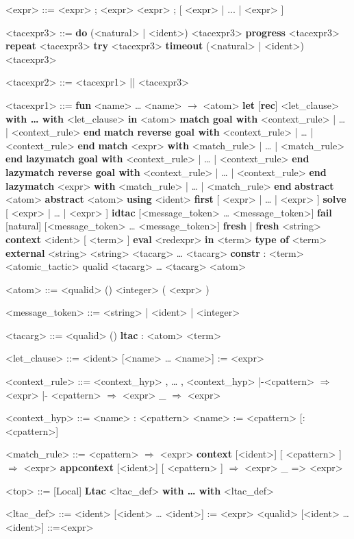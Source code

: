 \documentclass[a4paper, 10pt]{article}
\begin{document}
\begin{grammar}

<expr> ::= <expr> ; <expr>
\alt <expr> ; [ <expr> | ... | <expr> ]

<tacexpr3> ::= \textbf{do} (<natural> | <ident>) <tacexpr3>
 	\alt \textbf{progress} <tacexpr3>
 	\alt \textbf{repeat} <tacexpr3>
 	\alt \textbf{try} <tacexpr3>
 	\alt \textbf{timeout} (<natural> | <ident>) <tacexpr3>
 	\alt <tacexpr2>



<tacexpr2> ::= <tacexpr1> || <tacexpr3>
 	 \alt <tacexpr1>

<tacexpr1> ::= 	\textbf{fun} <name>  …  <name> $\rightarrow$ <atom>
 	\alt \textbf{let} [\textbf{rec}] <let\_clause> \textbf{with … with} <let\_clause> \textbf{in} <atom>
 	\alt \textbf{match goal with} <context\_rule> | … | <context\_rule> \textbf{end}
 	\alt \textbf{match reverse goal with} <context\_rule> | … | <context\_rule> \textbf{end}
 	\alt \textbf{match} <expr> \textbf{with} <match\_rule> | … | <match\_rule> \textbf{end}
 	\alt \textbf{lazymatch goal with} <context\_rule> | … | <context\_rule> \textbf{end}
 	\alt \textbf{lazymatch reverse goal with} <context\_rule> | … | <context\_rule> \textbf{end}
 	\alt \textbf{lazymatch} <expr> \textbf{with} <match\_rule> | … | <match\_rule> \textbf{end}
 	\alt \textbf{abstract} <atom>
 	\alt \textbf{abstract} <atom> \textbf{using} <ident>
 	\alt \textbf{first} [ <expr> | … | <expr> ]
 	\alt \textbf{solve} [ <expr> | … | <expr> ]
 	\alt \textbf{idtac} [<message\_token>  …  <message\_token>]
 	\alt \textbf{fail} [natural] [<message\_token>  …  <message\_token>]
 	\alt \textbf{fresh}  |  \textbf{fresh} <string>
 	\alt \textbf{context} <ident> [ <term> ]
 	\alt \textbf{eval} <redexpr> \textbf{in} <term>
 	\alt \textbf{type of} <term>
 	\alt \textbf{external} <string> <string> <tacarg>  …  <tacarg>
 	\alt \textbf{constr} : <term>
 	\alt <atomic\_tactic>
 	\alt qualid <tacarg>  …  <tacarg>
 	\alt <atom>

<atom> ::= <qualid>
 	\alt ()
 	\alt <integer>
 	\alt ( <expr> )

<message\_token> ::= <string>  |  <ident>  |  <integer>

<tacarg> ::= <qualid>
 	\alt ()
 	\alt \textbf{ltac} : <atom>
 	\alt <term>

<let\_clause>	::=	<ident> [<name>  …  <name>] := <expr>
 
<context\_rule> ::= <context\_hyp> , … , <context\_hyp> |-<cpattern> $\Rightarrow$ <expr>
 	\alt |- <cpattern> $\Rightarrow$ <expr>
 	\alt \_ $\Rightarrow$ <expr>
 
<context\_hyp>	::=	<name> : <cpattern>
 	\alt <name> := <cpattern> [: <cpattern>]
 
<match\_rule>	::=	<cpattern> $\Rightarrow$ <expr>
 	\alt \textbf{context} [<ident>] [ <cpattern> ] $\Rightarrow$ <expr>
 	\alt \textbf{appcontext} [<ident>] [ <cpattern> ] $\Rightarrow$ <expr>
 	\alt \_ => <expr>

<top> ::= [Local] \textbf{Ltac} <ltac\_def> \textbf{with … with} <ltac\_def>
 
<ltac\_def>	::=	<ident> [<ident>  …  <ident>] := <expr>
 	\alt <qualid> [<ident>  …  <ident>] ::=<expr>

\end{grammar}
\end{document}
